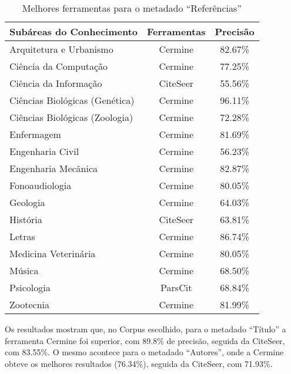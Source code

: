 \begin{table}
    \caption{Melhores ferramentas para o metadado ``Referências''}
    \begin{center}
        \begin{tabular}{|l|c|c|}
            \hline 
            \textbf{Subáreas do Conhecimento} & \textbf{Ferramentas} & \textbf{Precisão} \\ 
            \hline 
            Arquitetura e Urbanismo & Cermine & 82.67\% \\ \hline
            Ciência da Computação & Cermine & 77.25\% \\ \hline
            Ciência da Informação & CiteSeer & 55.56\% \\ \hline
            Ciências Biológicas (Genética) & Cermine & 96.11\% \\ \hline
            Ciências Biológicas (Zoologia) & Cermine & 72.28\% \\ \hline
            Enfermagem & Cermine & 81.69\% \\ \hline
            Engenharia Civil & Cermine & 56.23\% \\ \hline
            Engenharia Mecânica & Cermine & 82.87\% \\ \hline
            Fonoaudiologia & Cermine & 80.05\% \\ \hline
            Geologia & Cermine & 64.03\% \\ \hline
            História & CiteSeer & 63.81\% \\ \hline
            Letras & Cermine & 86.74\% \\ \hline
            Medicina Veterinária & Cermine & 80.05\% \\ \hline
            Música & Cermine & 68.50\% \\ \hline
            Psicologia & ParsCit & 68.84\% \\ \hline
            Zootecnia & Cermine & 81.99\% \\ \hline
        \end{tabular}
    \end{center}
    \label{tab:areas-references-tools}
\end{table}

Os resultados mostram que, no Corpus escolhido, para o metadado ``Título'' a ferramenta Cermine foi superior, com 89.8\% de precisão, seguida da CiteSeer, com 83.55\%. 
O mesmo acontece para o metadado ``Autores'', onde a Cermine obteve os melhores resultados (76.34\%), seguida da CiteSeer, com 71.93\%.


